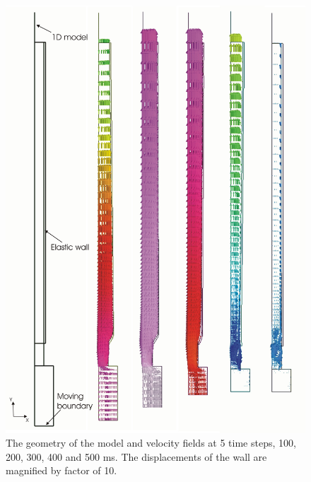 \begin{figure}[!hb]
\begin{center}
\includegraphics[width=\textwidth]{collage}
\caption{The geometry of the model and velocity fields at 5 time steps, 
100, 200, 300, 400 and 500 ms.  The displacements of the wall are 
magnified by factor of 10.}
\label{fig:velofields}
\end{center}
\end{figure}

